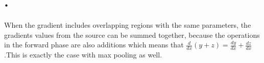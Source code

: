 \documentclass{article}
\begin{document}
\section{.}
When the gradient includes overlapping regions with the same parameters, the gradients values from the source can be summed together, because the operations in the forward phase are also additions which means that $\frac{d}{dx}(y+z) = \frac{dy}{dx} + \frac{dz}{dx}$.This is exactly the case with max pooling as well.
\end{document}
